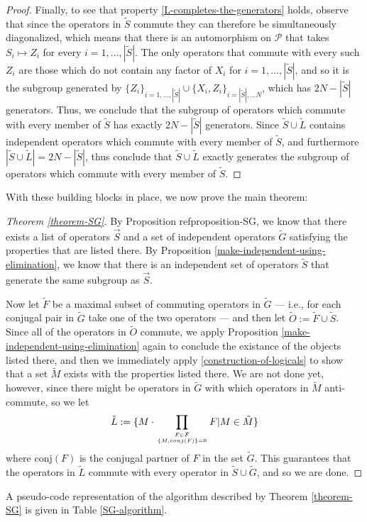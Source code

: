 \documentclass[twocolumn,showpacs,preprintnumbers,amsmath,amssymb,nofootinbib,pra,floatfix]{revtex4}
\newenvironment{remark}[1][Remark]{\begin{trivlist}
\item[\hskip \labelsep {\bfseries #1}]}{\end{trivlist}}
\newcommand{\lst}{\vec}
\newcommand{\set}{\tilde}
\begin{document}
\begin{proof}
Finally, to see that property \ref{L-completes-the-generators} holds, observe that since the operators in $\set S$ commute they can therefore be simultaneously diagonalized, which means that there is an automorphism on $\mathcal{P}$ that takes $S_i\mapsto Z_i$ for every $i=1,\dots,|\set S|$.  The only operators that commute with every such $Z_i$ are those which do not contain any factor of $X_i$ for $i=1,\dots,|\set S|$, and so it is the subgroup generated by $\{Z_i\}_{i=1,\dots,|\set S|}\cup \{X_i,Z_i\}_{i=|\set S|,\dots N}$, which has $2N-|\set S|$ generators.  Thus, we conclude that the subgroup of operators which commute with every member of $\set S$ has exactly $2N-|\set S|$ generators.  Since $\set S\cup\set L$ contains independent operators which commute with every member of $\set S$, and furthermore $|\set S\cup\set L|=2N-|\set S|$, thus conclude that $\set S\cup\set L$ exactly generates the subgroup of operators which commute with every member of $\set S$.
\end{proof}
With these building blocks in place, we now prove the main theorem:

\begin{proof}[Theorem \ref{theorem-SG}]
By Proposition ref{proposition-SG}, we know that there exists a list of operators $\lst S$ and a set of independent operators $\set G$ satisfying the properties that are listed there.  By Proposition \ref{make-independent-using-elimination}, we know that there is an independent set of operators $\set S$ that generate the same subgroup as $\lst S$.  

Now let $\set F$ be a maximal subset of commuting operators in $\set G$ --- i.e., for each conjugal pair in $\set G$ take one of the two operators --- and then let $\set O := \set F \cup \set S$.  Since all of the operators in $\set O$ commute, we apply Proposition \ref{make-independent-using-elimination} again to conclude the existance of the objects listed there, and then we immediately apply \ref{construction-of-logicals} to show that a set $\set M$ exists with the properties listed there.  We are not done yet, however, since there might be operators in $\set G$ with which operators in $\set M$ anti-commute, so we let
$$\set L := \{M\cdot\prod_{F\in \set F\atop \{M,conj(F)\}=0} F | M \in\set M\}$$
where $\text{conj}(F)$ is the conjugal partner of $F$ in the set $\set G$.  This guarantees that the operators in $\set L$ commute with every operator in $\set S\cup\set G$, and so we are done.
\end{proof}
\begin{remark}
A pseudo-code representation of the algorithm described by Theorem \ref{theorem-SG} is given in Table \ref{SG-algorithm}.
\end{remark}
\end{document}
